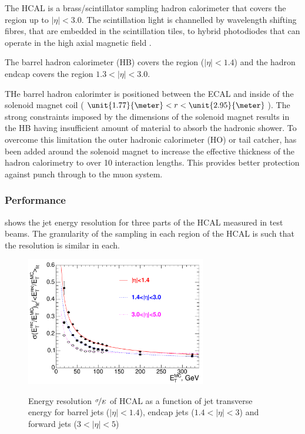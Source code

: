 The {HCAL} is a brass/scintillator
sampling hadron calorimeter that covers the region up to $|\eta|<3.0$.  The
scintillation light is channelled by wavelength shifting fibres, that are
embedded in the scintillation tiles, to hybrid photodiodes that can operate in
the high axial magnetic field \cite{cms}.

The barrel hadron calorimeter (HB) covers the region ($|\eta| < 1.4$)
and the hadron endcap covers the region $1.3 < |\eta| < 3.0$.

THe barrel hadron calorimter is
positioned between the ECAL and inside of the solenoid magnet coil
($\unit{1.77}{\meter}<r<\unit{2.95}{\meter}$).
The strong constraints imposed by the dimensions of the solenoid magnet results
in the HB having insufficient amount of material to absorb the hadronic shower. 
To overcome this limitation the outer hadronic calorimeter (HO) or tail catcher,
has been added around the solenoid magnet to increase the
effective thickness of the hadron calorimetry to over 10 interaction lengths.
This provides better protection against punch through to the muon system.

\subsubsection{Performance}

 shows the jet energy resolution for three parts of
the {HCAL} measured in test beams. The granularity of the sampling in each
region of the HCAL is such that the resolution is similar in each.
\begin{figure}[htbp]
  \centering
  \includegraphics[width=0.7\textwidth]{hcal_performance}
  \label{fig:hcalperform}
  \caption{Energy resolution $\nicefrac{\sigma}{E}$ of HCAL as a function of jet
transverse energy for barrel jets ($|\eta| < 1.4$), endcap jets ($1.4<|\eta| <
3$) and forward jets ($3<|\eta| < 5$) }
\end{figure}

